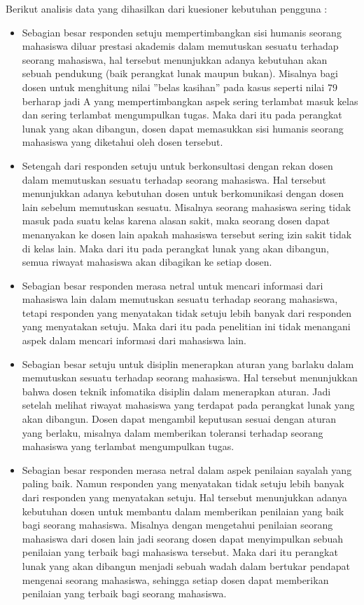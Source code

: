 Berikut analisis data yang dihasilkan dari kuesioner kebutuhan pengguna :
\begin{itemize}
\item Sebagian besar responden setuju mempertimbangkan sisi humanis seorang mahasiswa diluar prestasi akademis dalam memutuskan sesuatu terhadap seorang mahasiswa, hal tersebut menunjukkan adanya kebutuhan akan sebuah pendukung (baik perangkat lunak maupun bukan). Misalnya bagi dosen untuk menghitung nilai ''belas kasihan'' pada kasus seperti nilai 79 berharap jadi A yang mempertimbangkan aspek sering terlambat masuk kelas dan sering terlambat mengumpulkan tugas. Maka dari itu pada perangkat lunak yang akan dibangun, dosen dapat memasukkan sisi humanis seorang mahasiswa yang diketahui oleh dosen tersebut.
\item Setengah dari responden setuju untuk berkonsultasi dengan rekan dosen dalam memutuskan sesuatu terhadap seorang mahasiswa. Hal tersebut menunjukkan adanya kebutuhan dosen untuk berkomunikasi dengan dosen lain sebelum memutuskan sesuatu. Misalnya seorang mahasiswa sering tidak masuk pada suatu kelas karena alasan sakit, maka seorang dosen dapat menanyakan ke dosen lain apakah mahasiswa tersebut sering izin sakit tidak di kelas lain. Maka dari itu pada perangkat lunak yang akan dibangun, semua riwayat mahasiswa akan dibagikan ke setiap dosen.
\item Sebagian besar responden merasa netral untuk mencari informasi dari mahasiswa lain dalam memutuskan sesuatu terhadap seorang mahasiswa, tetapi responden yang menyatakan tidak setuju lebih banyak dari responden yang menyatakan setuju. Maka dari itu pada penelitian ini tidak menangani aspek dalam mencari informasi dari mahasiswa lain.
\item Sebagian besar setuju untuk disiplin menerapkan aturan yang barlaku dalam memutuskan sesuatu terhadap seorang mahasiswa. Hal tersebut menunjukkan bahwa dosen teknik infomatika disiplin dalam menerapkan aturan. Jadi setelah melihat riwayat mahasiswa yang terdapat pada perangkat lunak yang akan dibangun. Dosen dapat mengambil keputusan sesuai dengan aturan yang berlaku, misalnya dalam memberikan toleransi terhadap seorang mahasiswa yang terlambat mengumpulkan tugas.
\item Sebagian besar responden merasa netral dalam aspek penilaian sayalah yang paling baik. Namun responden yang menyatakan tidak setuju lebih banyak dari responden yang menyatakan setuju. Hal tersebut menunjukkan adanya kebutuhan dosen untuk membantu dalam memberikan penilaian yang baik bagi seorang mahasiswa. Misalnya dengan mengetahui penilaian seorang mahasiswa dari dosen lain jadi seorang dosen dapat menyimpulkan sebuah penilaian yang terbaik bagi mahasiswa tersebut. Maka dari itu perangkat lunak yang akan dibangun menjadi sebuah wadah dalam bertukar pendapat mengenai seorang mahasiswa, sehingga setiap dosen dapat memberikan penilaian yang terbaik bagi seorang mahasiswa.

\end{itemize}
